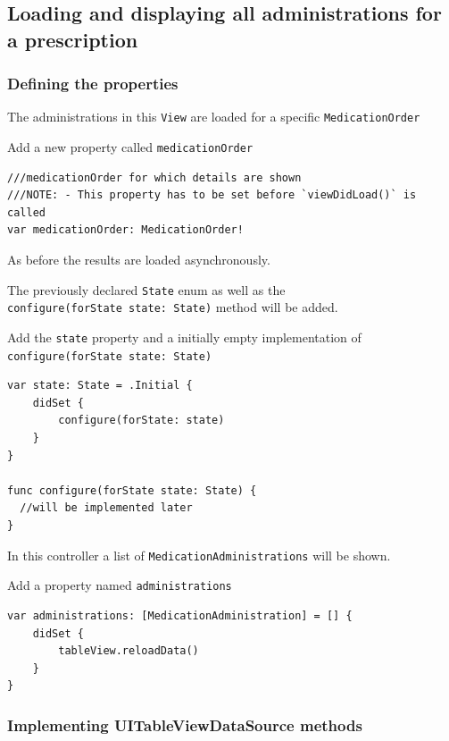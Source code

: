 \documentclass{article}
\begin{document}
\subsection{Loading and displaying all administrations for a prescription}\label{step-7.2---implementing-medicationdetailviewcontroller---loading-and-displaying-all-administrations-for-a-prescription}

\subsubsection{Defining the properties}\label{defining-properties}
The administrations in this \texttt{View} are loaded for a specific
\texttt{MedicationOrder}

Add a new property called \texttt{medicationOrder}

\begin{verbatim}
///medicationOrder for which details are shown
///NOTE: - This property has to be set before `viewDidLoad()` is called
var medicationOrder: MedicationOrder!
\end{verbatim}

As before the results are loaded asynchronously.

The previously declared \texttt{State} enum as well as the
\texttt{configure(forState\ state:\ State)} method will be added.

Add the \texttt{state} property and a initially empty implementation of
\texttt{configure(forState\ state:\ State)}

\begin{verbatim}
var state: State = .Initial {
    didSet {
        configure(forState: state)
    }
}

func configure(forState state: State) {
  //will be implemented later
}
\end{verbatim}

In this controller a list of \texttt{MedicationAdministrations} will be
shown.

Add a property named \texttt{administrations}

\begin{verbatim}
var administrations: [MedicationAdministration] = [] {
    didSet {
        tableView.reloadData()
    }
}
\end{verbatim}

\subsubsection{Implementing UITableViewDataSource methods}\label{implementing-uitableviewdatasource-methods}
\end{document}
